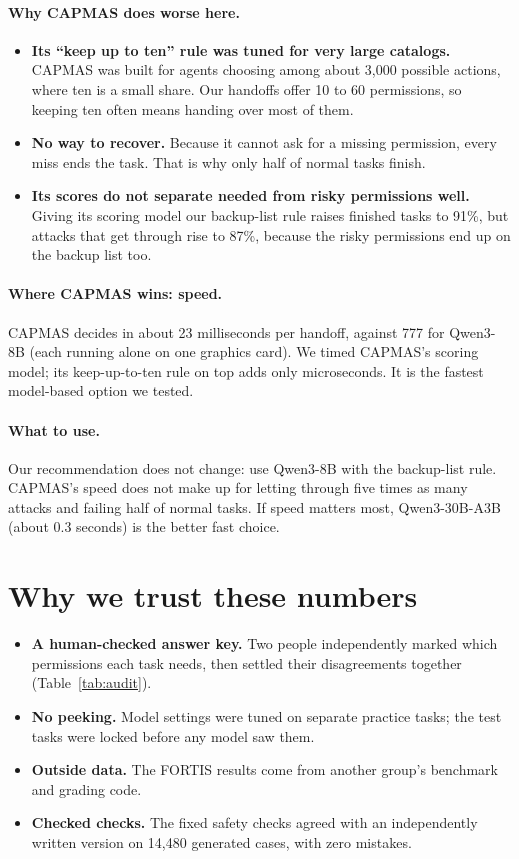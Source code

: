 \documentclass[11pt]{article}
\begin{document}
\paragraph{Why CAPMAS does worse here.}
\begin{itemize}
  \item \textbf{Its ``keep up to ten'' rule was tuned for very large catalogs.} CAPMAS was built for agents
    choosing among about 3,000 possible actions, where ten is a small share. Our handoffs offer 10 to 60
    permissions, so keeping ten often means handing over most of them.
  \item \textbf{No way to recover.} Because it cannot ask for a missing permission, every miss ends the task.
    That is why only half of normal tasks finish.
  \item \textbf{Its scores do not separate needed from risky permissions well.} Giving its scoring model our
    backup-list rule raises finished tasks to 91\%, but attacks that get through rise to 87\%, because the
    risky permissions end up on the backup list too.
\end{itemize}

\paragraph{Where CAPMAS wins: speed.}
CAPMAS decides in about 23 milliseconds per handoff, against 777 for Qwen3-8B (each running alone on
one graphics card). We timed CAPMAS's scoring model; its keep-up-to-ten rule on top adds only microseconds. It is the fastest model-based option we tested.

\paragraph{What to use.}
Our recommendation does not change: use Qwen3-8B with the backup-list rule. CAPMAS's speed does not make up
for letting through five times as many attacks and failing half of normal tasks. If speed matters most,
Qwen3-30B-A3B (about 0.3 seconds) is the better fast choice.

\section{Why we trust these numbers}
\begin{itemize}
  \item \textbf{A human-checked answer key.} Two people independently marked which permissions each task
    needs, then settled their disagreements together (Table~\ref{tab:audit}).
  \item \textbf{No peeking.} Model settings were tuned on separate practice tasks; the test tasks were
    locked before any model saw them.
  \item \textbf{Outside data.} The FORTIS results come from another group's benchmark and grading code.
  \item \textbf{Checked checks.} The fixed safety checks agreed with an independently written version on
    14,480 generated cases, with zero mistakes.
\end{itemize}
\end{document}
